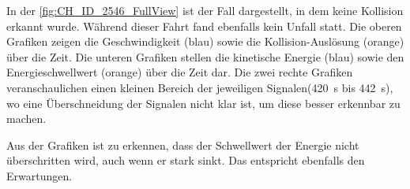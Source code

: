 

In der \autoref{fig:CH_ID_2546_FullView} ist der Fall dargestellt, in dem keine Kollision erkannt wurde. Während dieser Fahrt fand ebenfalls kein Unfall statt. 
Die oberen Grafiken zeigen die Geschwindigkeit (blau) sowie die Kollision-Auslösung (orange) über die Zeit.
Die unteren Grafiken stellen die kinetische Energie (blau) sowie den Energieschwellwert (orange) über die Zeit dar.
Die zwei rechte Grafiken veranschaulichen einen kleinen Bereich der jeweiligen Signalen(\SI[per-mode = symbol]{420}{\second} bis \SI[per-mode = symbol]{442}{\second}), wo eine Überschneidung der Signalen nicht klar ist, um diese besser erkennbar zu machen.

Aus der Grafiken ist zu erkennen, dass der Schwellwert der Energie nicht überschritten wird, auch wenn er stark sinkt. Das entspricht ebenfalls den Erwartungen.



